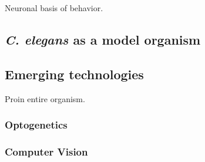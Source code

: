 Neuronal basis of behavior. 

\subsection{\textit{C. elegans} as a model organism}


\subsection{Emerging technologies}
Proin entire organism. 

\subsubsection{Optogenetics}
\subsubsection{Computer Vision}



